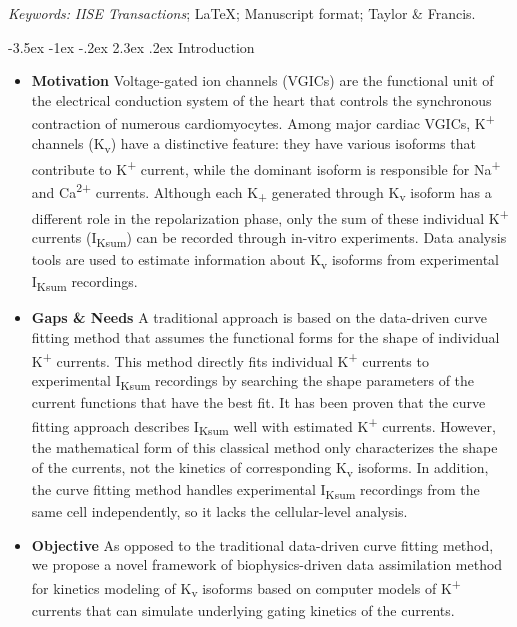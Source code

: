 \documentclass[11pt]{article}
\makeatletter
\renewcommand\section{\@startsection {section}{1}{\z@}%
                                   {-3.5ex \@plus -1ex \@minus -.2ex}%
                                   {2.3ex \@plus.2ex}%
                                   {\normalfont\fontfamily{phv}\fontsize{16}{19}\bfseries}}
\makeatother
\begin{document}
\noindent%
{\it Keywords:} \emph{IISE Transactions}; \LaTeX; Manuscript format; Taylor \& Francis.

{} %


\section{Introduction} \label{s:intro}
\begin{itemize}
    \item \textbf{Motivation} Voltage-gated ion channels (VGICs) are the functional unit of the electrical conduction system of the heart that controls the synchronous contraction of numerous cardiomyocytes. Among major cardiac VGICs, K\textsuperscript{+} channels (K\textsubscript{v}) have a distinctive feature: they have various isoforms that contribute to K\textsuperscript{+} current, while the dominant isoform is responsible for Na\textsuperscript{+} and Ca\textsuperscript{2+} currents. Although each K\textsubscript{+} generated through K\textsubscript{v} isoform has a different role in the repolarization phase, only the sum of these individual K\textsuperscript{+} currents (I\textsubscript{Ksum}) can be recorded through in-vitro experiments. Data analysis tools are used to estimate information about K\textsubscript{v} isoforms from experimental I\textsubscript{Ksum} recordings.
    \item \textbf{Gaps \& Needs} A traditional approach is based on the data-driven curve fitting method that assumes the functional forms for the shape of individual K\textsuperscript{+} currents. This method directly fits individual K\textsuperscript{+} currents to experimental I\textsubscript{Ksum} recordings by searching the shape parameters of the current functions that have the best fit. It has been proven that the curve fitting approach describes I\textsubscript{Ksum} well with estimated K\textsuperscript{+} currents. However, the mathematical form of this classical method only characterizes the shape of the currents, not the kinetics of corresponding K\textsubscript{v} isoforms. In addition, the curve fitting method handles experimental I\textsubscript{Ksum} recordings from the same cell independently, so it lacks the cellular-level analysis.
    \item \textbf{Objective} As opposed to the traditional data-driven curve fitting method, we propose a novel framework of biophysics-driven data assimilation method for kinetics modeling of K\textsubscript{v} isoforms based on computer models of K\textsuperscript{+} currents that can simulate underlying gating kinetics of the currents.

\end{itemize}
\end{document}
